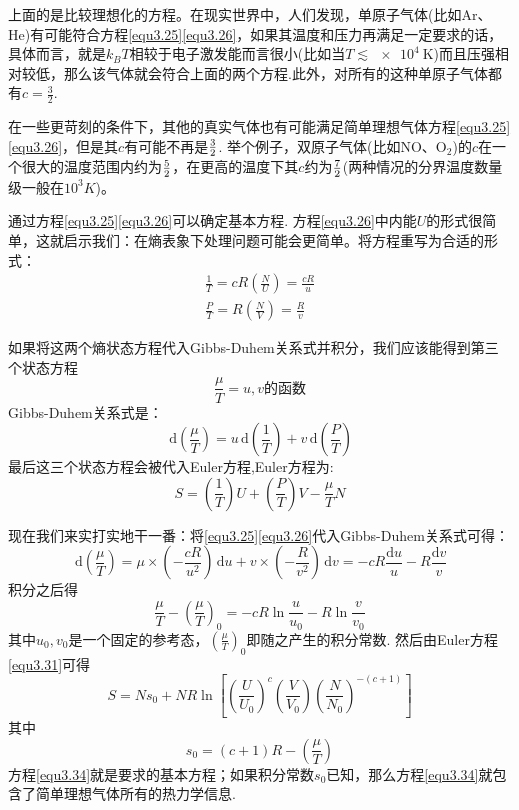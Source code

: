 上面的是比较理想化的方程。在现实世界中，人们发现，单原子气体(比如Ar、He)有可能符合方程\eqref{equ3.25}\eqref{equ3.26}，如果其温度和压力再满足一定要求的话，具体而言，就是$k_BT$相较于电子激发能而言很小(比如当$T\lesssim \SI{e4}{\kelvin}$)而且压强相对较低，那么该气体就会符合上面的两个方程.此外，对所有的这种单原子气体都有$c=\frac{3}{2}$.

在一些更苛刻的条件下，其他的真实气体也有可能满足简单理想气体方程\eqref{equ3.25}\eqref{equ3.26}，但是其$c$有可能不再是$3\over2$. 举个例子，双原子气体(比如NO、O$_2$)的$c$在一个很大的温度范围内约为${5\over2}$，在更高的温度下其$c$约为$7\over2$(两种情况的分界温度数量级一般在$10^3K$)。

通过方程\eqref{equ3.25}\eqref{equ3.26}可以确定基本方程. 方程\eqref{equ3.26}中内能$U$的形式很简单，这就启示我们：在熵表象下处理问题可能会更简单。将方程重写为合适的形式：
\begin{align}
\frac{1}{T}=cR\left(\frac{N}{U}\right)=\frac{cR}{u}\label{equ3.27}\\
\frac{P}{T}=R\left(\frac{N}{V}\right)=\frac{R}{v}\label{equ3.28}
\end{align}

如果将这两个熵状态方程代入Gibbs-Duhem关系式并积分，我们应该能得到第三个状态方程
\begin{equation}
\label{equ3.29}
\frac{\mu}{T}=u,v\text{的函数}
\end{equation}
Gibbs-Duhem关系式是：
\begin{equation}
\label{equ3.30}
\,\text{d}\left(\frac{\mu}{T}\right)=u\,\text{d}\left(\frac{1}{T}\right)+v\,\text{d}\left(\frac{P}{T}\right)
\end{equation}
最后这三个状态方程会被代入Euler方程,Euler方程为:
\begin{equation}
\label{equ3.31}
S=(\frac{1}{T})U+(\frac{P}{T})V-\frac{\mu}{T}N
\end{equation}

现在我们来实打实地干一番：将\eqref{equ3.25}\eqref{equ3.26}代入Gibbs-Duhem关系式可得：
\begin{equation}
\label{equ3.32}
\,\text{d}\left(\frac{\mu}{T}\right)=\mu\times\left(-\frac{cR}{u^2}\right)\,\text{d}u+v\times\left(-\frac{R}{v^2}\right)\,\text{d}v=-cR\frac{\text{d}u}{u}-R\frac{\text{d}v}{v}
\end{equation}
积分之后得
\begin{equation}
\label{equ3.33}
\frac{\mu}{T}-(\frac{\mu}{T})_0=-cR\ln{\frac{u}{u_0}}-R\ln{\frac{v}{v_0}}
\end{equation}
其中$u_0,v_0$是一个固定的参考态，$(\frac{\mu}{T})_0$即随之产生的积分常数. 然后由Euler方程\eqref{equ3.31}可得
\begin{equation}
\label{equ3.34}
S=Ns_0+NR\ln\left[\left(\frac{U}{U_0}\right)^c\left(\frac{V}{V_0}\right)\left(\frac{N}{N_0}\right)^{-(c+1)}\right]
\end{equation}
其中
\begin{equation}
\label{equ3.35}
s_0=(c+1)R-\left(\frac{\mu}{T}\right)
\end{equation}
方程\eqref{equ3.34}就是要求的基本方程；如果积分常数$s_0$已知，那么方程\eqref{equ3.34}就包含了简单理想气体所有的热力学信息.

